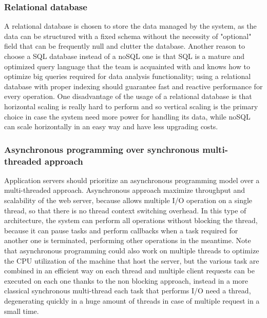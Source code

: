 \subsubsection{Relational database}
A relational database is chosen to store the data managed by the system, as the data can be structured with a fixed schema without the necessity of "optional" field that can be frequently null and clutter the database. Another reason to choose a SQL database instead of a noSQL one is that SQL is a mature and optimized query language that the team is acquainted with and knows how to optimize big queries required for data analysis functionality; using a relational database with proper indexing should guarantee fast and reactive performance for every operation. One disadvantage of the usage of a relational database is that horizontal scaling is really hard to perform and so vertical scaling is the primary choice in case the system need more power for handling its data, while noSQL can scale horizontally in an easy way and have less upgrading costs.

\subsubsection{Asynchronous programming over synchronous multi-threaded approach}
Application servers should prioritize an asynchronous programming model over a multi-threaded approach. Asynchronous approach maximize throughput and scalability of the web server, because allows multiple I/O operation on a single thread, so that there is no thread context switching overhead. In this type of architecture, the system can perform all operations without blocking the thread, because it can pause tasks and perform callbacks when a task required for another one is terminated, performing other operations in the meantime. Note that asynchronous programming could also work on multiple threads to optimize the CPU utilization of the machine that host the server, but the various task are combined in an efficient way on each thread and multiple client requests can be executed on each one thanks to the non blocking approach, instead in a more classical synchronous multi-thread each task that performs I/O need a thread, degenerating quickly in a huge amount of threads in case of multiple request in a small time.